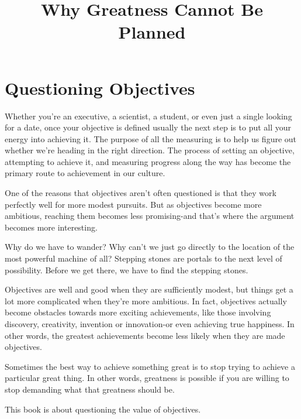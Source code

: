 \documentclass[ebook,12pt,oneside,openany]{memoir}
\begin{document}
\title{Why Greatness Cannot Be Planned}
\maketitle

\section{Questioning Objectives}
Whether you're an executive, a scientist, a student, or even just a single looking for a date, once your objective is defined usually the next step is to put all your energy into achieving it. 
The purpose of all the measuring is to help us figure out whether we're heading in the right direction.
The process of setting an objective, attempting to achieve it, and measuring progress along the way has become the primary route to achievement in our culture.

One of the reasons that objectives aren't often questioned is that they work perfectly well for more modest pursuits. But as objectives become more ambitious, reaching them becomes less promising-and that's where the argument becomes more interesting.

Why do we have to wander? Why can't we just go directly to the location of the most powerful machine of all? 
Stepping stones are portals to the next level of possibility. Before we get there, we have to find the stepping stones.

Objectives are well and good when they are sufficiently modest, but things get a lot more complicated when they're more ambitious.
In fact, objectives actually become obstacles towards more exciting achievements, like those involving discovery, creativity, invention or innovation-or even achieving true happiness.
In other words, the greatest achievements become less likely when they are made objectives.

Sometimes the best way to achieve something great is to stop trying to achieve a particular great thing.
In other words, greatness is possible if you are willing to stop demanding what that greatness should be.

This book is about questioning the value of objectives. 
\end{document}
